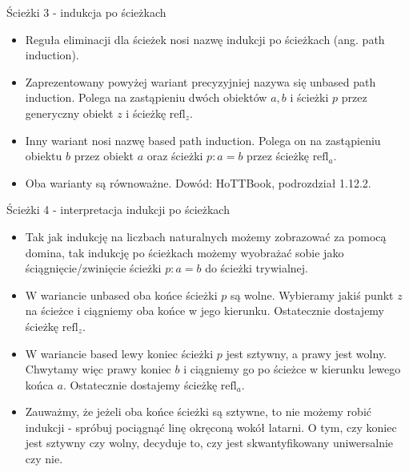 \documentclass{beamer}
\newcommand{\refl}[1]{\text{refl}_{#1}}
\begin{document}
\begin{frame}{Ścieżki 3 - indukcja po ścieżkach}
\begin{itemize}
	\item Reguła eliminacji dla ścieżek nosi nazwę indukcji po ścieżkach (ang. path induction).
	\item Zaprezentowany powyżej wariant precyzyjniej nazywa się unbased path induction. Polega na zastąpieniu dwóch obiektów $a, b$ i ścieżki $p$ przez generyczny obiekt $z$ i ścieżkę $\refl{z}$.
	\item Inny wariant nosi nazwę based path induction. Polega on na zastąpieniu obiektu $b$ przez obiekt $a$ oraz ścieżki $p : a = b$ przez ścieżkę $\refl{a}$.
	\item Oba warianty są równoważne. Dowód: HoTTBook, podrozdział 1.12.2.
\end{itemize}
\end{frame}

\begin{frame}{Ścieżki 4 - interpretacja indukcji po ścieżkach}
\begin{itemize}
	\item Tak jak indukcję na liczbach naturalnych możemy zobrazować za pomocą domina, tak indukcję po ścieżkach możemy wyobrażać sobie jako ściągnięcie/zwinięcie ścieżki $p : a = b$ do ścieżki trywialnej.
	\item W wariancie unbased oba końce ścieżki $p$ są wolne. Wybieramy jakiś punkt $z$ na ścieżce i ciągniemy oba końce w jego kierunku. Ostatecznie dostajemy ścieżkę $\refl{z}$.
	\item W wariancie based lewy koniec ścieżki $p$ jest sztywny, a prawy jest wolny. Chwytamy więc prawy koniec $b$ i ciągniemy go po ścieżce w kierunku lewego końca $a$. Ostatecznie dostajemy ścieżkę $\refl{a}$.
	\item Zauważmy, że jeżeli oba końce ścieżki są sztywne, to nie możemy robić indukcji - spróbuj pociągnąć linę okręconą wokół latarni. O tym, czy koniec jest sztywny czy wolny, decyduje to, czy jest skwantyfikowany uniwersalnie czy nie.
\end{itemize}
\end{frame}
\end{document}
